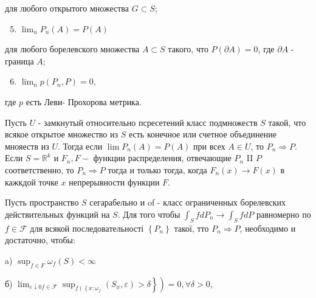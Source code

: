 \documentclass[10pt]{article}
\begin{document}
для любого открытого множества $G \subset S$;



\begin{enumerate}

  \setcounter{enumi}{4}

  \item $\lim _{n} P_{n}(A)=P(A)$

\end{enumerate}



для любого борелевского множества $A \subset S$ такого, что $P(\partial A)=0$, где $\partial A$ - граница $A$;



\begin{enumerate}

  \setcounter{enumi}{5}

  \item $\lim _{n} p\left(P_{n}, P\right)=0$,

\end{enumerate}



где $p$ есть Леви- Прохорова метрика.



Пусть $U$ - замкнутый относительно псресетений класс подмножеств $S$ такой, что всякое открытое множество из $S$ есть конечное или счетное объединение мнояеств из $U$. Тогда если $\lim P_{n}(A)=P(A)$ при всех $A \in U$, то $P_{n} \Rightarrow P$. Если $S=\mathbb{R}^{k}$ и $F_{n}, F-$ функции распределения, отвечающие $P_{n}$ II $P$ соответственно, то $P_{n} \Rightarrow P$ тогда и только тогда, когда $F_{n}(x) \rightarrow F(x)$ в кажкдой точке $x$ непрерывности функции $F$.



Пусть пространство $S$ сегарабельно и of - класс ограниченных борелевских действительных функций на $S$. Для того чтобы $\int_{S} f d P_{n} \rightarrow \int_{S} f d P$ равномерно по $f \in \mathscr{F}$ для всякой последовательності $\left\{P_{n}\right\}$ такої, тто $P_{n} \Rightarrow P$, необходимо и достаточно, чтобы:



a) $\sup _{f \in F} \omega_{f}(S)<\infty$



б) $\left.\left.\lim _{\varepsilon \downarrow 0 f \in \mathcal{F}} \sup _{f\left(\left\{x: \omega_{f}\right.\right.}\left(S_{x}, \varepsilon\right)>\delta\right\}\right)=0, \forall \delta>0$,
\end{document}
